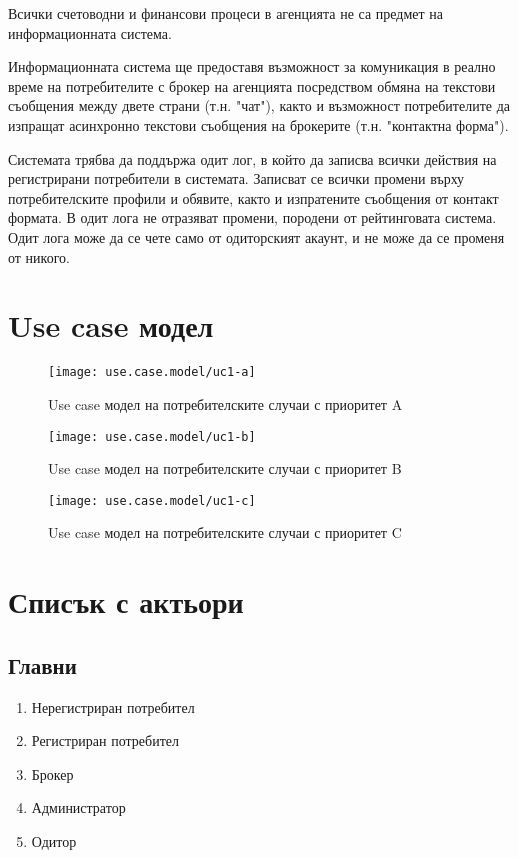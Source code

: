 \documentclass[]{article}
\begin{document}
Всички счетоводни и финансови процеси в агенцията не са предмет на информационната система.

Информационната система ще предоставя възможност за комуникация в реално време на потребителите с брокер на агенцията посредством обмяна на текстови съобщения между двете страни (т.н. "чат"), както и възможност потребителите да изпращат асинхронно текстови съобщения на брокерите (т.н. "контактна форма").

Системата трябва да поддържа одит лог, в който да записва всички действия на регистрирани потребители в системата. 
Записват се всички промени върху потребителските профили и обявите, както и изпратените съобщения от контакт формата.
В одит лога не отразяват промени, породени от рейтинговата система. Одит лога може да се чете само от одиторският акаунт, и не може да се променя от никого.

\clearpage

\section*{Use case модел} %

        \begin{figure}[h]
        \centering
        \texttt{[image: use.case.model/uc1-a]}
        \caption{Use case модел на потребителските случаи с приоритет A}
        \end{figure}

\clearpage

        \begin{figure}[h]
        \centering
        \texttt{[image: use.case.model/uc1-b]}
        \caption{Use case модел на потребителските случаи с приоритет B}
        \end{figure}

\clearpage

        \begin{figure}[h]
        \centering
        \texttt{[image: use.case.model/uc1-c]}
        \caption{Use case модел на потребителските случаи с приоритет C}
        \end{figure}

\section*{Списък с актьори}

\subsection{Главни}
\begin{enumerate}
\item Нерегистриран потребител
\item Регистриран потребител
\item Брокер
\item Администратор
\item Одитор
\end{enumerate}
\end{document}
